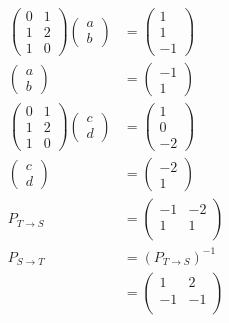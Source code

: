 \documentclass[12pt]{article}
\newenvironment{problem}[2][Problem]{\begin{trivlist}
\item[\hskip \labelsep {\bfseries #1}\hskip \labelsep {\bfseries #2.}]}{\end{trivlist}}
\begin{document}
\begin{problem}{1.b}
\end{problem}
\begin{align*}
\left( \begin{array}{cc}
	0 & 1 \\
	1 & 2 \\
	1 & 0 
\end{array} \right)
\left( \begin{array}{c}
	a \\
	b
\end{array} \right)
&= 
\left( \begin{array}{c}
	1 \\
	1 \\
	-1
\end{array} \right) \\
\left( \begin{array}{c}
	a \\
	b
\end{array} \right)
&= 
\left( \begin{array}{c}
	-1 \\
	1
\end{array} \right) \\
\left( \begin{array}{cc}
	0 & 1 \\
	1 & 2 \\
	1 & 0 
\end{array} \right)
\left( \begin{array}{c}
	c \\
	d
\end{array} \right)
&= 
\left( \begin{array}{c}
	1 \\
	0 \\
	-2
\end{array} \right) \\
\left( \begin{array}{c}
	c \\
	d
\end{array} \right)
&= 
\left( \begin{array}{c}
	-2 \\
	1
\end{array} \right) \\
P_{T \to S} &=
\left( \begin{array}{cc}
	-1 & -2 \\
	1 & 1\\
\end{array} \right) \\
P_{S \to T} &= (P_{T \to S})^{-1} \\
&= 
\left( \begin{array}{cc}
	1 & 2 \\
	-1 & -1\\
\end{array} \right)
\end{align*}
\end{document}
